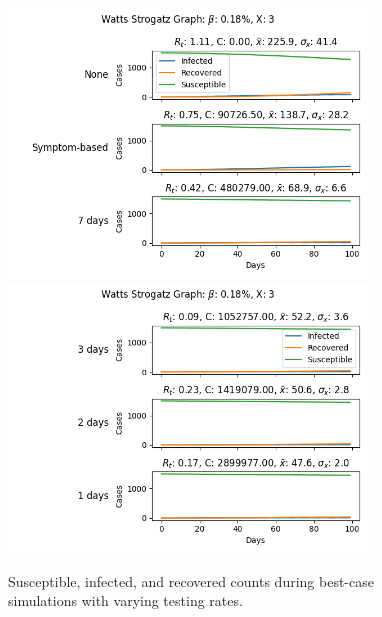 \documentclass[fullpage]{extarticle}
\begin{document}
\begin{large}
\begin{flushleft}
\begin{figure}
\begin{center}
	\label{fig2}
	\includegraphics[width=0.85\textwidth]{figures/ws/results_best_none-symp-7}
	\includegraphics[width=0.85\textwidth]{figures/ws/results_best_3-2-1}
	\caption{Susceptible, infected, and recovered counts during best-case simulations with varying testing rates.}
\end{center}
\end{figure}


\end{flushleft}
\end{large}
\end{document}
